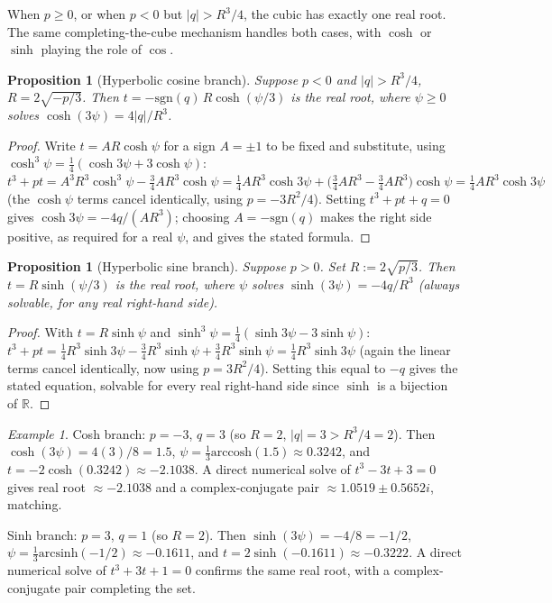 \documentclass[11pt]{amsart}
\newtheorem{proposition}[theorem]{Proposition}
\theoremstyle{remark}
\newtheorem*{example}{Example}
\begin{document}
When $p\ge0$, or when $p<0$ but $|q|>R^3/4$, the cubic has exactly one real root. The same completing-the-cube mechanism handles both cases, with $\cosh$ or $\sinh$ playing the role of $\cos$.

\begin{proposition}[Hyperbolic cosine branch]\label{prop:cosh-branch}
Suppose $p<0$ and $|q|>R^3/4$, $R=2\sqrt{-p/3}$. Then $t=-\mathrm{sgn}(q)\,R\cosh(\psi/3)$ is the real root, where $\psi\ge0$ solves $\cosh(3\psi)=4|q|/R^3$.
\end{proposition}

\begin{proof}
Write $t=AR\cosh\psi$ for a sign $A=\pm1$ to be fixed and substitute, using $\cosh^3\psi=\tfrac14(\cosh3\psi+3\cosh\psi)$: $t^3+pt=A^3R^3\cosh^3\psi-\tfrac34AR^3\cosh\psi=\tfrac14AR^3\cosh3\psi+\bigl(\tfrac34AR^3-\tfrac34AR^3\bigr)\cosh\psi=\tfrac14AR^3\cosh3\psi$ (the $\cosh\psi$ terms cancel identically, using $p=-3R^2/4$). Setting $t^3+pt+q=0$ gives $\cosh3\psi=-4q/(AR^3)$; choosing $A=-\mathrm{sgn}(q)$ makes the right side positive, as required for a real $\psi$, and gives the stated formula.
\end{proof}

\begin{proposition}[Hyperbolic sine branch]\label{prop:sinh-branch}
Suppose $p>0$. Set $R:=2\sqrt{p/3}$. Then $t=R\sinh(\psi/3)$ is the real root, where $\psi$ solves $\sinh(3\psi)=-4q/R^3$ (always solvable, for any real right-hand side).
\end{proposition}

\begin{proof}
With $t=R\sinh\psi$ and $\sinh^3\psi=\tfrac14(\sinh3\psi-3\sinh\psi)$: $t^3+pt=\tfrac14R^3\sinh3\psi-\tfrac34R^3\sinh\psi+\tfrac34R^3\sinh\psi=\tfrac14R^3\sinh3\psi$ (again the linear terms cancel identically, now using $p=3R^2/4$). Setting this equal to $-q$ gives the stated equation, solvable for every real right-hand side since $\sinh$ is a bijection of $\mathbb R$.
\end{proof}

\begin{example}
Cosh branch: $p=-3$, $q=3$ (so $R=2$, $|q|=3>R^3/4=2$). Then $\cosh(3\psi)=4(3)/8=1.5$, $\psi=\tfrac13\mathrm{arccosh}(1.5)\approx0.3242$, and $t=-2\cosh(0.3242)\approx-2.1038$. A direct numerical solve of $t^3-3t+3=0$ gives real root $\approx-2.1038$ and a complex-conjugate pair $\approx1.0519\pm0.5652i$, matching.

Sinh branch: $p=3$, $q=1$ (so $R=2$). Then $\sinh(3\psi)=-4/8=-1/2$, $\psi=\tfrac13\mathrm{arcsinh}(-1/2)\approx-0.1611$, and $t=2\sinh(-0.1611)\approx-0.3222$. A direct numerical solve of $t^3+3t+1=0$ confirms the same real root, with a complex-conjugate pair completing the set.
\end{example}
\end{document}
